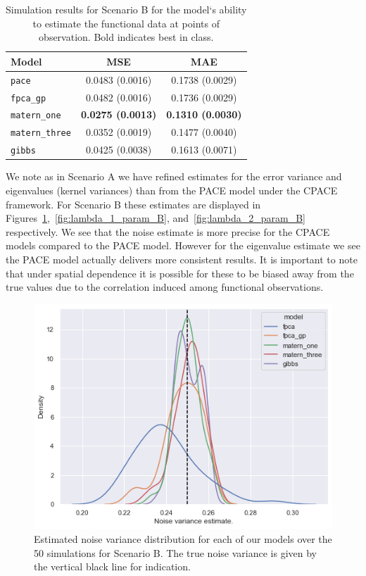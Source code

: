 \begin{table}
	\caption[Simulation results for Scenario B on observed data]{Simulation results for Scenario B for the model`s ability to estimate the functional data at points of observation. Bold indicates best in class.}
	\centering
	\label{tab:train_B}
	\begin{tabular}{lcc}
		\toprule
		\textbf{Model} & \textbf{MSE} & \textbf{MAE} \\
		\midrule
		\verb*|pace| & 0.0483 (0.0016) & 0.1738	(0.0029) \\
		\verb*|fpca_gp| & 0.0482 (0.0016) & 0.1736 (0.0029) \\
		\verb*|matern_one| & \textbf{0.0275	(0.0013)} & \textbf{0.1310	(0.0030)} \\
		\verb*|matern_three| & 0.0352 (0.0019) & 0.1477	(0.0040) \\
		\verb*|gibbs| & 0.0425 (0.0038) & 0.1613 (0.0071)\\
		\bottomrule
	\end{tabular}
\end{table}

We note as in Scenario A we have refined estimates for the error variance and eigenvalues (kernel variances) than from the PACE model under the CPACE framework. 
For Scenario B these estimates are displayed in Figures~\ref{fig:noise_param_B},~\ref{fig:lambda_1_param_B}, and~\ref{fig:lambda_2_param_B} respectively. 
We see that the noise estimate is more precise for the CPACE models compared to the PACE model.
However for the eigenvalue estimate we see the PACE model actually delivers more consistent results.
It is important to note that under spatial dependence it is possible for these to be biased away from the true values due to the correlation induced among functional observations.

\begin{figure}
	\centering
	\includegraphics[width=\textwidth]{noise_param_B}
	\caption[Estimated noise variance distribution for each of our models over the 50 simulations for Scenario B.]{Estimated noise variance distribution for each of our models over the 50 simulations for Scenario B. The true noise variance is given by the vertical black line for indication.}
	\label{fig:noise_param_B}
\end{figure}

